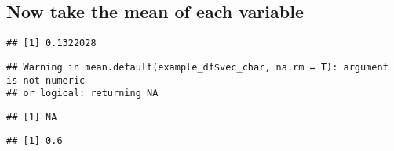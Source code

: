 \documentclass[
]{article}
\newenvironment{Shaded}{\begin{snugshade}}{\end{snugshade}}
\newcommand{\AttributeTok}[1]{\textcolor[rgb]{0.77,0.63,0.00}{#1}}
\newcommand{\FunctionTok}[1]{\textcolor[rgb]{0.00,0.00,0.00}{#1}}
\newcommand{\NormalTok}[1]{#1}
\newcommand{\SpecialCharTok}[1]{\textcolor[rgb]{0.00,0.00,0.00}{#1}}
\begin{document}
\hypertarget{now-take-the-mean-of-each-variable}{%
\subsection{Now take the mean of each
variable}\label{now-take-the-mean-of-each-variable}}

\begin{Shaded}
\end{Shaded}

\begin{verbatim}
## [1] 0.1322028
\end{verbatim}

\begin{Shaded}
\end{Shaded}

\begin{verbatim}
## Warning in mean.default(example_df$vec_char, na.rm = T): argument is not numeric
## or logical: returning NA
\end{verbatim}

\begin{verbatim}
## [1] NA
\end{verbatim}

\begin{Shaded}
\end{Shaded}

\begin{verbatim}
## [1] 0.6
\end{verbatim}

\begin{Shaded}
\end{Shaded}
\end{document}
